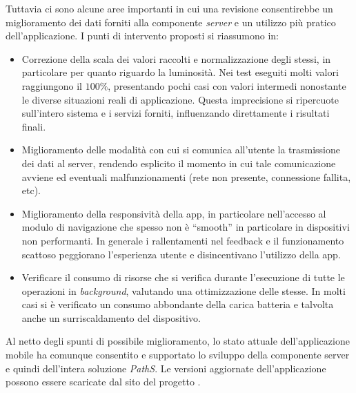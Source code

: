 Tuttavia ci sono alcune aree importanti in cui una revisione consentirebbe un miglioramento dei dati forniti alla componente \emph{server} e un utilizzo più pratico dell'applicazione. 
I punti di intervento proposti si riassumono in:
\begin{itemize}
\item Correzione della scala dei valori raccolti e normalizzazione degli stessi, in particolare per quanto riguardo la luminosità. Nei test eseguiti molti valori raggiungono il $100\%$, presentando pochi casi con valori intermedi nonostante le diverse situazioni reali di applicazione. Questa imprecisione si ripercuote sull'intero sistema e i servizi forniti, influenzando direttamente i risultati finali.
\item Miglioramento delle modalità con cui si comunica all'utente la trasmissione dei dati al server, rendendo esplicito il momento in cui tale comunicazione avviene ed eventuali malfunzionamenti (rete non presente, connessione fallita, etc).
\item Miglioramento della responsività della app, in particolare nell'accesso al modulo di navigazione che spesso non è ``smooth'' in particolare in dispositivi non performanti. In generale i rallentamenti nel feedback e il funzionamento scattoso peggiorano l'esperienza utente e disincentivano l'utilizzo della app.
\item Verificare il consumo di risorse che si verifica durante l'esecuzione di tutte le operazioni in \emph{background}, valutando una ottimizzazione delle stesse. In molti casi si è verificato un consumo abbondante della carica batteria e talvolta anche un surriscaldamento del dispositivo.
\end{itemize}
Al netto degli spunti di possibile miglioramento, lo stato attuale dell'applicazione mobile ha comunque consentito e supportato lo sviluppo della componente server e quindi dell'intera soluzione \emph{PathS}. Le versioni aggiornate dell'applicazione possono essere scaricate dal sito del progetto \cite{paths-graphs}.
